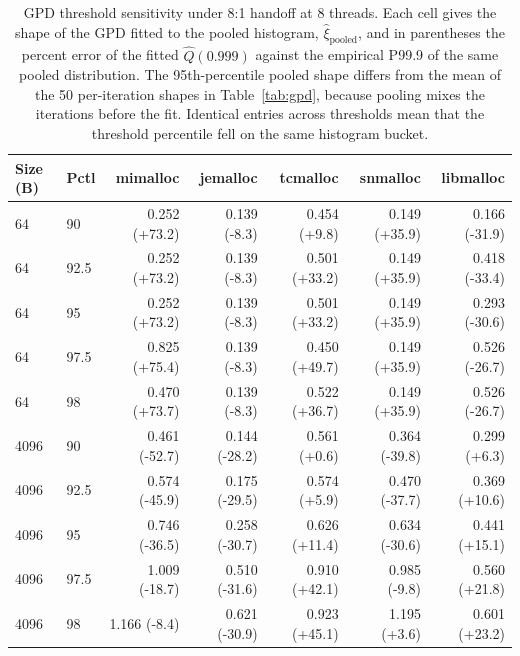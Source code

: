 \begin{table}[!htbp]
\centering
\footnotesize
\setlength{\tabcolsep}{4pt}
\caption{GPD threshold sensitivity under 8:1 handoff at 8 threads. Each cell gives the shape of the GPD fitted to the pooled histogram, $\hat{\xi}_{\text{pooled}}$, and in parentheses the percent error of the fitted $\hat{Q}(0.999)$ against the empirical P99.9 of the same pooled distribution. The 95th-percentile pooled shape differs from the mean of the 50 per-iteration shapes in Table~\ref{tab:gpd}, because pooling mixes the iterations before the fit. Identical entries across thresholds mean that the threshold percentile fell on the same histogram bucket.}
\label{tab:gpd-sensitivity}
\begin{tabular}{llrrrrr}
\toprule
Size (B) & Pctl & mimalloc & jemalloc & tcmalloc & snmalloc & libmalloc\\
\midrule
64 & 90 & 0.252 (+73.2) & 0.139 (-8.3) & 0.454 (+9.8) & 0.149 (+35.9) & 0.166 (-31.9) \\
64 & 92.5 & 0.252 (+73.2) & 0.139 (-8.3) & 0.501 (+33.2) & 0.149 (+35.9) & 0.418 (-33.4) \\
64 & 95 & 0.252 (+73.2) & 0.139 (-8.3) & 0.501 (+33.2) & 0.149 (+35.9) & 0.293 (-30.6) \\
64 & 97.5 & 0.825 (+75.4) & 0.139 (-8.3) & 0.450 (+49.7) & 0.149 (+35.9) & 0.526 (-26.7) \\
64 & 98 & 0.470 (+73.7) & 0.139 (-8.3) & 0.522 (+36.7) & 0.149 (+35.9) & 0.526 (-26.7) \\
4096 & 90 & 0.461 (-52.7) & 0.144 (-28.2) & 0.561 (+0.6) & 0.364 (-39.8) & 0.299 (+6.3) \\
4096 & 92.5 & 0.574 (-45.9) & 0.175 (-29.5) & 0.574 (+5.9) & 0.470 (-37.7) & 0.369 (+10.6) \\
4096 & 95 & 0.746 (-36.5) & 0.258 (-30.7) & 0.626 (+11.4) & 0.634 (-30.6) & 0.441 (+15.1) \\
4096 & 97.5 & 1.009 (-18.7) & 0.510 (-31.6) & 0.910 (+42.1) & 0.985 (-9.8) & 0.560 (+21.8) \\
4096 & 98 & 1.166 (-8.4) & 0.621 (-30.9) & 0.923 (+45.1) & 1.195 (+3.6) & 0.601 (+23.2) \\
\bottomrule
\end{tabular}
\end{table}
